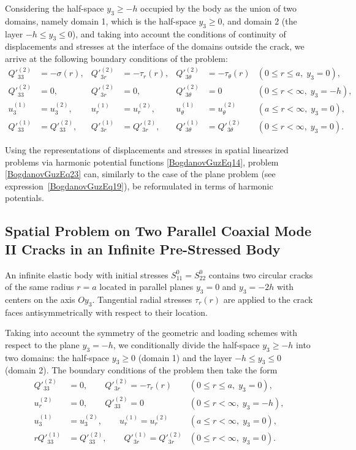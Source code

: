 Considering the half-space $y_{3} \ge -h$ occupied by the body as the union of two domains, namely domain 1, which is the half-space $y_{3} \ge 0$, and domain 2 (the layer $-h \le y_{3} \le 0$), and taking into account the conditions of continuity of displacements and stresses at the interface of the domains outside the crack, we arrive at the following boundary conditions of the problem:
\begin{align}
	\nonumber
	Q'^{(2)}_{33} &= -\sigma(r), &
	Q'^{(2)}_{3r} &= -\tau_r(r), &
	Q'^{(2)}_{3\theta} &= -\tau_{\theta}(r)
	& (0 \le r \le a,\; y_{3}=0),
	\\
	\nonumber
	Q'^{(2)}_{33} &= 0, &
	Q'^{(2)}_{3r} &= 0, &
	Q'^{(2)}_{3\theta} &= 0
	& (0 \le r < \infty,\; y_{3}=-h),
	\\
	\nonumber
	u^{(1)}_{3} &= u^{(2)}_{3}, &
	u^{(1)}_{r} &= u^{(2)}_{r}, &
	u^{(1)}_{\theta} &= u^{(2)}_{\theta}
	& (a \le r < \infty,\; y_{3}=0),
	\\
	\label{BogdanovGuzEq23}
	Q'^{(1)}_{33} &= Q'^{(2)}_{33}, &
	Q'^{(1)}_{3r} &= Q'^{(2)}_{3r}, &
	Q'^{(1)}_{3\theta} &= Q'^{(2)}_{3\theta}
	& (0 \le r < \infty,\; y_{3}=0).
\end{align}

Using the representations of displacements and stresses in spatial linearized problems via harmonic potential functions \eqref{BogdanovGuzEq14}, problem \eqref{BogdanovGuzEq23} can, similarly to the case of the plane problem (see expression~\eqref{BogdanovGuzEq19}), be reformulated in terms of harmonic potentials.

\subsection{Spatial Problem on Two Parallel Coaxial Mode II Cracks in an Infinite Pre-Stressed Body}

\noindent 

\noindent An infinite elastic body with initial stresses $S_{11}^{0}=S_{22}^{0}$ contains two circular cracks of the same radius $r=a$ located in parallel planes $y_{3}=0$ and $y_{3}=-2h$ with centers on the axis $Oy_{3}$. Tangential radial stresses $\tau_r(r)$ are applied to the crack faces antisymmetrically with respect to their location. 

Taking into account the symmetry of the geometric and loading schemes with respect to the plane $y_{3}=-h$, we conditionally divide the half-space $y_{3}\ge -h$ into two domains: the half-space $y_{3}\ge 0$ (domain 1) and the layer $-h\le y_{3}\le 0$ (domain 2). The boundary conditions of the problem then take the form
\begin{align}
	\nonumber
	Q'^{(2)}_{33} &= 0, \qquad
	Q'^{(2)}_{3r} = -\tau_r(r)
	& (0 \le r \le a,\; y_{3}=0),
	\\
	\nonumber
	u^{(2)}_{r} &= 0, \qquad
	Q'^{(2)}_{33} = 0
	& (0 \le r < \infty,\; y_{3}=-h),
	\\
	\nonumber
	u^{(1)}_{3} &= u^{(2)}_{3}, \qquad
	u^{(1)}_{r} = u^{(2)}_{r}
	& (a \le r < \infty,\; y_{3}=0),
	\\ 	\label{BogdanovGuzEq24}
	r
	Q'^{(1)}_{33} &= Q'^{(2)}_{33}, \qquad
	Q'^{(1)}_{3r} = Q'^{(2)}_{3r}
	& (0 \le r < \infty,\; y_{3}=0).
\end{align}

